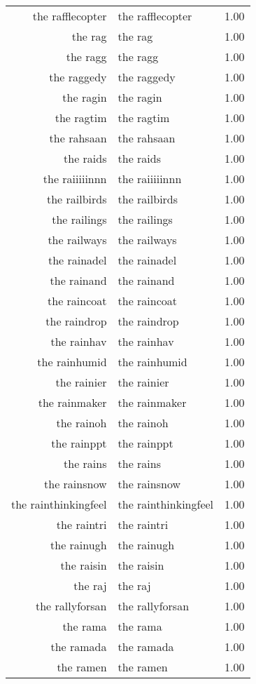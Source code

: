 \begin{table}[ht]
\begin{tabular}{rlr}
  the rafflecopter & the rafflecopter & 1.00 \\ 
  the rag & the rag & 1.00 \\ 
  the ragg & the ragg & 1.00 \\ 
  the raggedy & the raggedy & 1.00 \\ 
  the ragin & the ragin & 1.00 \\ 
  the ragtim & the ragtim & 1.00 \\ 
  the rahsaan & the rahsaan & 1.00 \\ 
  the raids & the raids & 1.00 \\ 
  the raiiiiinnn & the raiiiiinnn & 1.00 \\ 
  the railbirds & the railbirds & 1.00 \\ 
  the railings & the railings & 1.00 \\ 
  the railways & the railways & 1.00 \\ 
  the rainadel & the rainadel & 1.00 \\ 
  the rainand & the rainand & 1.00 \\ 
  the raincoat & the raincoat & 1.00 \\ 
  the raindrop & the raindrop & 1.00 \\ 
  the rainhav & the rainhav & 1.00 \\ 
  the rainhumid & the rainhumid & 1.00 \\ 
  the rainier & the rainier & 1.00 \\ 
  the rainmaker & the rainmaker & 1.00 \\ 
  the rainoh & the rainoh & 1.00 \\ 
  the rainppt & the rainppt & 1.00 \\ 
  the rains & the rains & 1.00 \\ 
  the rainsnow & the rainsnow & 1.00 \\ 
  the rainthinkingfeel & the rainthinkingfeel & 1.00 \\ 
  the raintri & the raintri & 1.00 \\ 
  the rainugh & the rainugh & 1.00 \\ 
  the raisin & the raisin & 1.00 \\ 
  the raj & the raj & 1.00 \\ 
  the rallyforsan & the rallyforsan & 1.00 \\ 
  the rama & the rama & 1.00 \\ 
  the ramada & the ramada & 1.00 \\ 
  the ramen & the ramen & 1.00 \\ 

\end{tabular}
\end{table}
